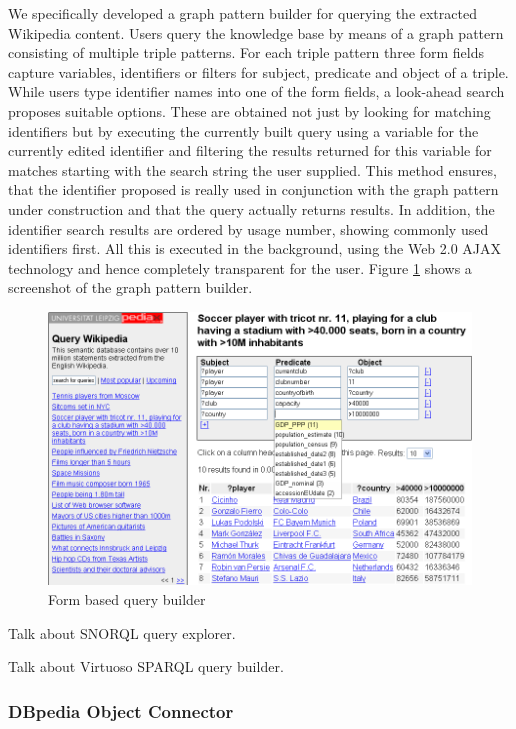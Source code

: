 \documentclass{llncs}
\begin{document}
We specifically developed a graph pattern builder for querying the extracted Wikipedia content. Users query the knowledge base by means of a graph pattern consisting of multiple triple patterns. For each triple pattern three form fields capture variables, identifiers or filters for subject, predicate and object of a triple. While users type identifier names into one of the form fields, a look-ahead search proposes suitable options. These are obtained not just by looking for matching identifiers but by executing the currently built query using a variable for the currently edited identifier and filtering the results returned for this variable for matches starting with the search string the user supplied. This method ensures, that the identifier proposed is really used in conjunction with the graph pattern under construction and that the query actually returns results. In addition, the identifier search results are ordered by usage number, showing commonly used identifiers first. All this is executed in the background, using the Web 2.0 AJAX technology and hence completely transparent for the user. Figure \ref{fig:querybuilder} shows a screenshot of the graph pattern builder.

\begin{figure}[htbp]
	\centering
		\includegraphics[width=0.80\columnwidth]{querybuilder}
	\caption{Form based query builder}
	\label{fig:querybuilder}
\end{figure}

Talk about SNORQL query explorer.

Talk about Virtuoso SPARQL query builder.

\subsubsection*{DBpedia Object Connector}
\end{document}

